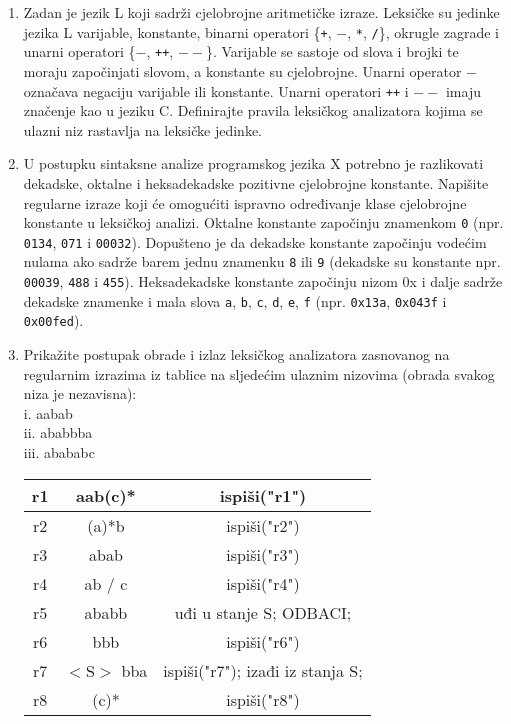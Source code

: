 \documentclass[times, 12pt, utf8]{book}
\begin{document}
\begin{enumerate}[resume]
\item
Zadan je jezik L koji sadrži cjelobrojne aritmetičke izraze.
Leksičke su jedinke jezika L varijable, konstante, binarni operatori \{\texttt{+}, \texttt{\(-\)}, \texttt{*}, \texttt{/}\}, okrugle zagrade i unarni operatori \{\texttt{\(-\)}, \texttt{++}, \texttt{\(--\)}\}.
Varijable se sastoje od slova i brojki te moraju započinjati slovom, a konstante su cjelobrojne.
Unarni operator \texttt{\(-\)} označava negaciju varijable ili konstante.
Unarni operatori \texttt{++} i \texttt{\(--\)} imaju značenje kao u jeziku C.
Definirajte pravila leksičkog analizatora kojima se ulazni niz rastavlja na leksičke jedinke. \cite[str.~47-48]{udzbenik}

\item
U postupku sintaksne analize programskog jezika X potrebno je razlikovati dekadske, oktalne i heksadekadske pozitivne cjelobrojne konstante.
Napišite regularne izraze koji će omogućiti ispravno određivanje klase cjelobrojne konstante u leksičkoj analizi.
Oktalne konstante započinju znamenkom \texttt{0} (npr. \texttt{0134}, \texttt{071} i \texttt{00032}).
Dopušteno je da dekadske konstante započinju vodećim nulama ako sadrže barem jednu znamenku \texttt{8} ili \texttt{9} (dekadske su konstante npr. \texttt{00039}, \texttt{488} i \texttt{455}).
Heksadekadske konstante započinju nizom 0x i dalje sadrže dekadske znamenke i mala slova \texttt{a}, \texttt{b}, \texttt{c}, \texttt{d}, \texttt{e}, \texttt{f}  (npr. \texttt{0x13a}, \texttt{0x043f} i \texttt{0x00fed}). \cite[str.~47-48]{udzbenik}

\item
Prikažite postupak obrade i izlaz leksičkog analizatora zasnovanog na regularnim izrazima iz tablice na sljedećim ulaznim nizovima (obrada svakog niza je nezavisna): \cite[str.~47-48]{udzbenik} \cite{auditorne}\\
i. aabab\\
ii. ababbba\\
iii. abababc

\begin{tabular}{|c|c|c|} \hline
r1 & aab(c)* & ispiši("r1") \\ \hline
r2 & (a)*b & ispiši("r2") \\ \hline
r3 & abab & ispiši("r3") \\ \hline
r4 & ab / c & ispiši("r4") \\ \hline
r5 & ababb & uđi u stanje S; ODBACI; \\ \hline
r6 & bbb & ispiši("r6") \\ \hline
r7 & $<$S$>$ bba & ispiši("r7"); izađi iz stanja S; \\ \hline
r8 & (c)* & ispiši("r8") \\ \hline
\end{tabular}


\end{enumerate}
\end{document}
